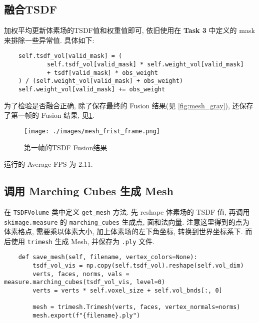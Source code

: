 \documentclass[11pt]{article}
\newcommand\1{\mathds{1}}
\begin{document}
\subsection{融合TSDF}
加权平均更新体素场的TSDF值和权重值即可, 依旧使用在 \textbf{Task 3} 中定义的 mask 来排除一些异常值. 具体如下:
\begin{verbatim}
    self.tsdf_vol[valid_mask] = (
            self.tsdf_vol[valid_mask] * self.weight_vol[valid_mask]
            + tsdf[valid_mask] * obs_weight
    ) / (self.weight_vol[valid_mask] + obs_weight)
    self.weight_vol[valid_mask] += obs_weight
\end{verbatim}
为了检验是否融合正确, 除了保存最终的 Fusion 结果(见 \cref{fig:mesh_gray}), 还保存了第一帧的 Fusion 结果, 见\cref{fig:mesh_first_frame}.
\begin{figure}[htbp]
    \centering
    \texttt{[image: ./images/mesh\_frist\_frame.png]}
    \caption{第一帧的TSDF Fusion结果}
    \label{fig:mesh_first_frame}
\end{figure}

运行的 Average FPS 为 2.11. 
\subsection{调用 Marching Cubes 生成 Mesh}
在 \texttt{TSDFVolume} 类中定义 \texttt{get\_mesh} 方法. 先 reshape 体素场的 TSDF 值, 再调用 \texttt{skimage.measure} 的 \texttt{marching\_cubes} 生成点, 面和法向量.
注意这里得到的点为体素格点, 需要乘以体素大小, 加上体素场的左下角坐标, 转换到世界坐标系下. 而后使用 \texttt{trimesh} 生成 Mesh, 并保存为 \texttt{.ply} 文件.
\begin{verbatim}
    def save_mesh(self, filename, vertex_colors=None):
        tsdf_vol_vis = np.copy(self.tsdf_vol).reshape(self.vol_dim)
        verts, faces, norms, vals = measure.marching_cubes(tsdf_vol_vis, level=0)
        verts = verts * self.voxel_size + self.vol_bnds[:, 0]

        mesh = trimesh.Trimesh(verts, faces, vertex_normals=norms)
        mesh.export(f"{filename}.ply")
\end{verbatim}
\end{document}
